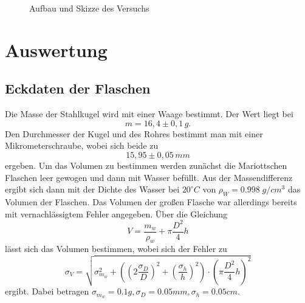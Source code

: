 \documentclass[a4paper, 11pt]{article}
\begin{document}
\begin{figure}[H]
\begin{minipage}[t]{0.45\linewidth}
	\end{minipage}
	\label{fig:Aufbau des Versuchs}
	\caption{Aufbau und Skizze des Versuchs}	
\end{figure}



\clearpage
\section{Auswertung}
\subsection{Eckdaten der Flaschen}
Die Masse der Stahlkugel wird mit einer Waage bestimmt. Der Wert liegt bei
\begin{equation}
m = 16,4 \pm 0,1 \,g.
\end{equation}
Den Durchmesser der Kugel und des Rohres bestimmt man mit einer Mikrometerschraube, wobei sich beide zu
\begin{equation}
15,95 \pm 0,05 \,mm
\end{equation}
ergeben. Um das Volumen zu bestimmen werden zunächst die Mariottschen Flaschen leer gewogen und dann mit Wasser befüllt. Aus der Massendifferenz ergibt sich dann mit der Dichte des Wasser bei $20^\circ C$ von $\rho_W = 0.998 \; g/cm^3$ das Volumen der Flaschen. Das Volumen der großen Flasche war allerdings bereits mit vernachlässigtem Fehler angegeben. Über die Gleichung
\begin{equation}
V = \frac{m_w}{\rho_w} + \pi \frac{D^2}{4} h
\end{equation}
lässt sich das Volumen bestimmen, wobei sich der Fehler zu
\begin{equation}
\sigma_V = \sqrt{\sigma_{m_w}^2 + \left(\left(2 \frac{\sigma_D}{D}\right)^2 + \left(\frac{\sigma_h}{h}\right)^2\right) \cdot \left(\pi \frac{D^2}{4} h\right)^2}
\end{equation}
ergibt. Dabei betragen $\sigma_{m_w} = 0.1g, \sigma_D = 0.05mm, \sigma_h = 0.05cm$.
\end{document}
